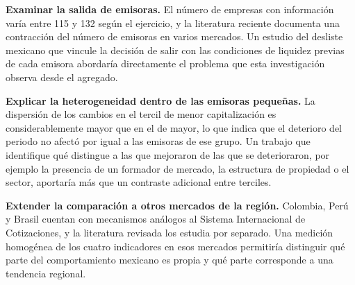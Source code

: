 \textbf{Examinar la salida de emisoras.} El número de empresas con información varía entre 115 y 132 según el ejercicio, y la literatura reciente documenta una contracción del número de emisoras en varios mercados. Un estudio del desliste mexicano que vincule la decisión de salir con las condiciones de liquidez previas de cada emisora abordaría directamente el problema que esta investigación observa desde el agregado.

\textbf{Explicar la heterogeneidad dentro de las emisoras pequeñas.} La dispersión de los cambios en el tercil de menor capitalización es considerablemente mayor que en el de mayor, lo que indica que el deterioro del periodo no afectó por igual a las emisoras de ese grupo. Un trabajo que identifique qué distingue a las que mejoraron de las que se deterioraron, por ejemplo la presencia de un formador de mercado, la estructura de propiedad o el sector, aportaría más que un contraste adicional entre terciles.

\textbf{Extender la comparación a otros mercados de la región.} Colombia, Perú y Brasil cuentan con mecanismos análogos al Sistema Internacional de Cotizaciones, y la literatura revisada los estudia por separado. Una medición homogénea de los cuatro indicadores en esos mercados permitiría distinguir qué parte del comportamiento mexicano es propia y qué parte corresponde a una tendencia regional.


